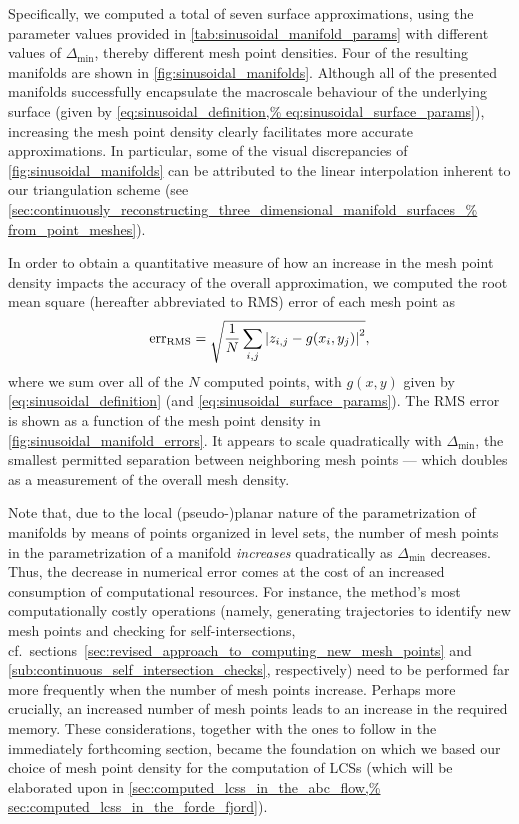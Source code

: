 Specifically, we computed a total of seven surface approximations, using
the parameter values provided in \cref{tab:sinusoidal_manifold_params} with
different values of $\Delta_{\min}$, thereby different mesh point densities.
Four of the resulting manifolds are shown in \cref{fig:sinusoidal_manifolds}.
Although all of the presented manifolds successfully encapsulate the macroscale
behaviour of the underlying surface (given by \cref{eq:sinusoidal_definition,%
eq:sinusoidal_surface_params}), increasing the mesh point density clearly
facilitates more accurate approximations. In particular, some of the visual
discrepancies of \cref{fig:sinusoidal_manifolds} can be attributed to
the linear interpolation inherent to our triangulation scheme
(see \cref{sec:continuously_reconstructing_three_dimensional_manifold_surfaces_%
from_point_meshes}).





In order to obtain a quantitative measure of how an increase in the mesh
point density impacts the accuracy of the overall approximation, we
computed the root mean square (hereafter abbreviated to RMS) error of each mesh
point as
\begin{equation}
    \label{eq:sinusoidal_rms}
    \text{err}_{\text{RMS}} = \sqrt{\frac{1}{N}\sum\limits_{i,j}\abs{z_{i,j}-g(x_{i},y_{j})}^{2}},
\end{equation}
where we sum over all of the $N$ computed points, with $g(x,y)$ given
by \cref{eq:sinusoidal_definition} (and \cref{eq:sinusoidal_surface_params}).
The RMS error is shown as a function of the mesh point density in
\cref{fig:sinusoidal_manifold_errors}. It appears to scale quadratically
with $\Delta_{\min}$, the smallest permitted separation between neighboring
mesh points --- which doubles as a measurement of the overall mesh density.



Note that, due to the local (pseudo-)planar nature of the parametrization of
manifolds by means of points organized in level sets, the number of mesh points
in the parametrization of a manifold \emph{increases} quadratically as
$\Delta_{\min}$ decreases. Thus, the decrease in numerical error comes at the
cost of an increased consumption of computational resources. For instance,
the method's most computationally costly operations (namely, generating
trajectories to identify new mesh points and checking for self-intersections,
cf.\ sections~\ref{sec:revised_approach_to_computing_new_mesh_points} and
\ref{sub:continuous_self_intersection_checks}, respectively) need to be
performed far more frequently when the number of mesh points increase.
Perhaps more crucially, an increased number of mesh points leads to an
increase in the required memory. These considerations, together with the
ones to follow in the immediately forthcoming section, became the foundation
on which we based our choice of mesh point density for the computation of
LCSs (which will be elaborated upon in \cref{sec:computed_lcss_in_the_abc_flow,%
sec:computed_lcss_in_the_forde_fjord}).

